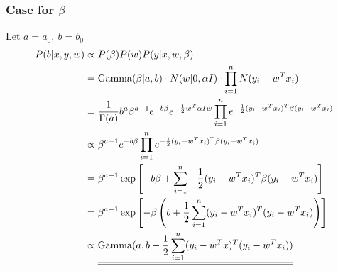 \documentclass[12pt]{article}
\begin{document}
        \subsubsection*{Case for $\beta$}
            Let $a=a_0,\ b=b_0$
            \begin{align}
                P(b|x, y, w) &\propto P(\beta) P(w) P(y|x,w,\beta)\\
                &= \operatorname{Gamma}(\beta|a, b) \cdot N(w|0,\alpha I) \cdot \prod\limits_{i=1}^{n} N(y_i - w^T x_i) \\
                &= \frac{1}{\Gamma(a)}b^{a}\beta^{a-1}e^{-b\beta}e^{-{\frac{1}{2}} w^T \alpha I w} \prod\limits_{i=1}^{n} e^{-{\frac{1}{2}} (y_i - w^T x_i)^T \beta (y_i - w^T x_i)} \\ 
                &\propto \beta^{a-1}e^{-b\beta} \prod\limits_{i=1}^{n} e^{-{\frac{1}{2}} (y_i - w^T x_i)^T \beta (y_i - w^T x_i)} \\ 
                &= \beta^{a-1} \exp\left[-b\beta + \sum\limits_{i=1}^{n} -\frac{1}{2}(y_i-w^Tx_i)^T\beta(y_i-w^Tx_i)\right] \\ 
                &= \beta^{a-1} \exp\left[-\beta\left(b + \frac{1}{2} \sum\limits_{i=1}^{n} (y_i-w^Tx_i)^T(y_i-w^Tx_i)\right)\right] \\
                &\propto \underline{\underline{\operatorname{Gamma}(a, b+\frac{1}{2} \sum\limits_{i=1}^{n} (y_i-w^Tx)^T(y_i-w^Tx_i))}}
            \end{align}
\end{document}
